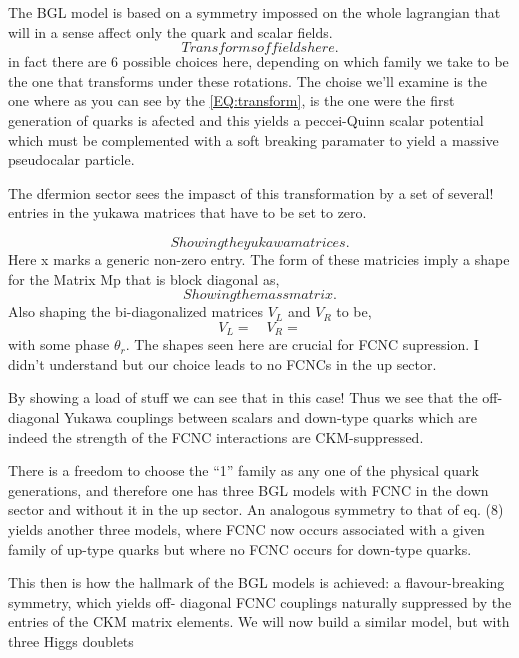 The BGL model is based on a symmetry impossed on the whole lagrangian that will in a sense affect only the quark and scalar fields. 
\begin{equation}
\label{EQ:transform}
Transforms of fields here. 
\end{equation}
in fact there are 6 possible choices here, depending on which family we take to be the one that transforms under these rotations.  The choise we'll examine is the one where as you can see by the \ref{EQ:transform}, is the one were the first generation of quarks is afected and this yields a peccei-Quinn scalar potential which must be complemented with a soft breaking paramater to yield a massive pseudocalar particle. 

The dfermion sector sees the impasct of this transformation by a set of several! entries in the yukawa matrices that have to be set to zero. 

\begin{equation}
Showing the yukawa matrices.
\end{equation} 
Here x marks a generic non-zero entry. The form of these matricies imply a shape for the Matrix Mp that is block diagonal as,
\begin{equation}
Showing the mass matrix. 
\end{equation}
Also shaping the bi-diagonalized matrices $V_L$ and $V_R$ to be,
\begin{equation}
V_L = \quad V_R = 
\end{equation}
with some phase $\theta_r$. The shapes seen here are crucial for FCNC supression. I didn't understand but our choice leads to no FCNCs in the up sector.  


By showing a load of stuff we can see that in this case! Thus we see that the off-diagonal Yukawa couplings between scalars and down-type quarks which are indeed the strength of the FCNC interactions are CKM-suppressed. 

There is a freedom to choose the “1” family as
any one of the physical quark generations, and therefore one has three BGL models with FCNC in the down
sector and without it in the up sector. An analogous symmetry to that of eq. (8) yields another three models,
where FCNC now occurs associated with a given family of up-type quarks but where no FCNC occurs for
down-type quarks.

This then is how the hallmark of the BGL models is achieved: a flavour-breaking symmetry, which yields off-
diagonal FCNC couplings naturally suppressed by the entries of the CKM matrix elements. We will now build
a similar model, but with three Higgs doublets


